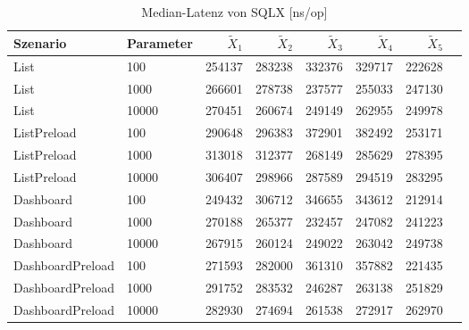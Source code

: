 
\begin{table}[ht]
\setlength{\extrarowheight}{-1pt}
\centering
\caption{Median-Latenz von SQLX [ns/op]}
\begin{tabular}{llrrrrrr}
\toprule
Szenario & Parameter & ${\tilde{X}_1}$ & ${\tilde{X}_2}$ & ${\tilde{X}_3}$ & ${\tilde{X}_4}$ & ${\tilde{X}_5}$ \\
\midrule
	List & 100 & 254137 & 283238 & 332376 & 329717 & 222628 \\
	List & 1000 & 266601 & 278738 & 237577 & 255033 & 247130 \\
	List & 10000 & 270451 & 260674 & 249149 & 262955 & 249978 \\
	ListPreload & 100 & 290648 & 296383 & 372901 & 382492 & 253171 \\
	ListPreload & 1000 & 313018 & 312377 & 268149 & 285629 & 278395 \\
	ListPreload & 10000 & 306407 & 298966 & 287589 & 294519 & 283295 \\
	Dashboard & 100 & 249432 & 306712 & 346655 & 343612 & 212914 \\
	Dashboard & 1000 & 270188 & 265377 & 232457 & 247082 & 241223 \\
	Dashboard & 10000 & 267915 & 260124 & 249022 & 263042 & 249738 \\
	DashboardPreload & 100 & 271593 & 282000 & 361310 & 357882 & 221435 \\
	DashboardPreload & 1000 & 291752 & 283532 & 246287 & 263138 & 251829 \\
	DashboardPreload & 10000 & 282930 & 274694 & 261538 & 272917 & 262970 \\
\bottomrule
\end{tabular}
\label{tab:durchsatz_sqlx}
\end{table}
	